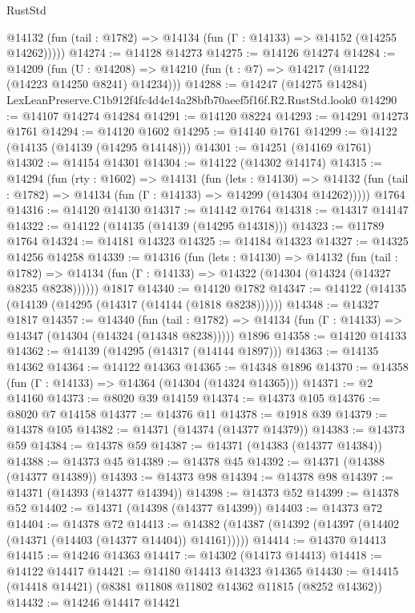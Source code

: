 \begin{lexlean}{RustStd}
\begin{coremodule}
      @14132 (fun (tail : @1782) => @14134 (fun (Γ : @14133) => @14152 (@14255 @14262)))))
@14274 := @14128 @14273
@14275 := @14126 @14274
@14284 := @14209
    (fun (U : @14208) => @14210 (fun (t : @7) => @14217 (@14122 (@14223 @14250 @8241) @14234)))
@14288 := @14247 (@14275 @14284) LexLeanPreserve.C1b912f4fc4d4e14a28bfb70aeef5f16f.R2.RustStd.look0
@14290 := @14107 @14274 @14284
@14291 := @14120 @8224
@14293 := @14291 @14273 @1761
@14294 := @14120 @1602
@14295 := @14140 @1761
@14299 := @14122 (@14135 (@14139 (@14295 @14148)))
@14301 := @14251 (@14169 @1761)
@14302 := @14154 @14301
@14304 := @14122 (@14302 @14174)
@14315 := @14294
    (fun (rty : @1602) =>
    @14131
      (fun (lets : @14130) =>
      @14132 (fun (tail : @1782) => @14134 (fun (Γ : @14133) => @14299 (@14304 @14262)))))
    @1764
@14316 := @14120 @14130
@14317 := @14142 @1764
@14318 := @14317 @14147
@14322 := @14122 (@14135 (@14139 (@14295 @14318)))
@14323 := @11789 @1764
@14324 := @14181 @14323
@14325 := @14184 @14323
@14327 := @14325 @14256 @14258
@14339 := @14316
    (fun (lets : @14130) =>
    @14132
      (fun (tail : @1782) =>
      @14134 (fun (Γ : @14133) => @14322 (@14304 (@14324 (@14327 @8235 @8238))))))
    @1817
@14340 := @14120 @1782
@14347 := @14122 (@14135 (@14139 (@14295 (@14317 (@14144 (@1818 @8238))))))
@14348 := @14327 @1817
@14357 := @14340
    (fun (tail : @1782) => @14134 (fun (Γ : @14133) => @14347 (@14304 (@14324 (@14348 @8238)))))
    @1896
@14358 := @14120 @14133
@14362 := @14139 (@14295 (@14317 (@14144 @1897)))
@14363 := @14135 @14362
@14364 := @14122 @14363
@14365 := @14348 @1896
@14370 := @14358 (fun (Γ : @14133) => @14364 (@14304 (@14324 @14365)))
@14371 := @2 @14160
@14373 := @8020 @39 @14159
@14374 := @14373 @105
@14376 := @8020 @7 @14158
@14377 := @14376 @11
@14378 := @1918 @39
@14379 := @14378 @105
@14382 := @14371 (@14374 (@14377 @14379))
@14383 := @14373 @59
@14384 := @14378 @59
@14387 := @14371 (@14383 (@14377 @14384))
@14388 := @14373 @45
@14389 := @14378 @45
@14392 := @14371 (@14388 (@14377 @14389))
@14393 := @14373 @98
@14394 := @14378 @98
@14397 := @14371 (@14393 (@14377 @14394))
@14398 := @14373 @52
@14399 := @14378 @52
@14402 := @14371 (@14398 (@14377 @14399))
@14403 := @14373 @72
@14404 := @14378 @72
@14413 := @14382 (@14387 (@14392 (@14397 (@14402 (@14371 (@14403 (@14377 @14404)) @14161)))))
@14414 := @14370 @14413
@14415 := @14246 @14363
@14417 := @14302 (@14173 @14413)
@14418 := @14122 @14417
@14421 := @14180 @14413 @14323 @14365
@14430 := @14415 (@14418 @14421) (@8381 @11808 @11802 @14362 @11815 (@8252 @14362))
@14432 := @14246 @14417 @14421

\end{coremodule}
\end{lexlean}

